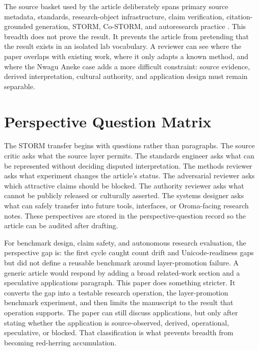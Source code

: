 \documentclass[sigconf,nonacm]{acmart}
\begin{document}
The source basket used by the article deliberately spans primary source
metadata, standards, research-object infrastructure, claim verification,
citation-grounded generation, STORM, Co-STORM, and autoresearch practice
\cite{azuonye1992,omniglotNwagu,unicodeAfricanScripts2023,scriptSourceNwagu,sirisNwaguProposal,teiP5Glyphs,iiifPresentation3,w3cAnnotationModel,w3cAnnotationVocab,w3cProvO,rocrate12,cidocCrm,datacite45,wilkinson2016fair,carroll2020care,wadden2020scifact,gao2023alce,karpathyAutoresearch,shao2024storm,jiang2024costorm,acmSubmissions,arxivSubmitTex}. This breadth does not prove the result. It prevents the article
from pretending that the result exists in an isolated lab vocabulary. A
reviewer can see where the paper overlaps with existing work, where it only
adapts a known method, and where the Nwagu Aneke case adds a more difficult
constraint: source evidence, derived interpretation, cultural authority, and
application design must remain separable.

\section{Perspective Question Matrix}
The STORM transfer begins with questions rather than paragraphs. The source
critic asks what the source layer permits. The standards engineer asks what can
be represented without deciding disputed interpretation. The methods reviewer
asks what experiment changes the article's status. The adversarial reviewer asks
which attractive claims should be blocked. The authority reviewer asks what
cannot be publicly released or culturally asserted. The systems designer asks
what can safely transfer into future tools, interfaces, or Oroma-facing
research notes. These perspectives are stored in the perspective-question record so the
article can be audited after drafting.

For benchmark design, claim safety, and autonomous research evaluation, the perspective gap is: the first cycle caught count drift and Unicode-readiness gaps but did not define a reusable benchmark around layer-promotion failure. A generic article would respond by
adding a broad related-work section and a speculative applications paragraph.
This paper does something stricter. It converts the gap into a testable
research operation, the layer-promotion benchmark experiment, and then limits the manuscript to the result
that operation supports. The paper can still discuss applications, but only
after stating whether the application is source-observed, derived, operational,
speculative, or blocked. That classification is what prevents breadth from
becoming red-herring accumulation.
\end{document}
